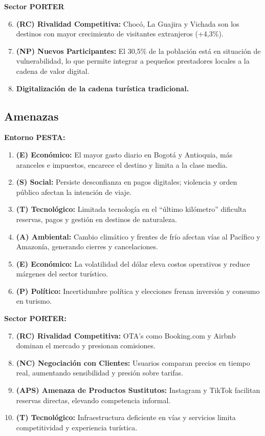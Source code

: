 \documentclass[12pt,a4paper]{article}
\newcommand{\subsectiontitle}[1]{\subsection{#1}}
\begin{document}
\textbf{Sector PORTER}

\begin{enumerate}
    \setcounter{enumi}{5}
    \item \textbf{(RC) Rivalidad Competitiva:} Chocó, La Guajira y Vichada son los destinos con mayor crecimiento de visitantes extranjeros (+4,3\%).
    \item \textbf{(NP) Nuevos Participantes:} El 30,5\% de la población está en situación de vulnerabilidad, lo que permite integrar a pequeños prestadores locales a la cadena de valor digital.
    \item \textbf{Digitalización de la cadena turística tradicional.}
\end{enumerate}

\subsectiontitle{Amenazas}

\textbf{Entorno PESTA:}

\begin{enumerate}
    \item \textbf{(E) Económico:} El mayor gasto diario en Bogotá y Antioquia, más aranceles e impuestos, encarece el destino y limita a la clase media.
    \item \textbf{(S) Social:} Persiste desconfianza en pagos digitales; violencia y orden público afectan la intención de viaje.
    \item \textbf{(T) Tecnológico:} Limitada tecnología en el ``último kilómetro'' dificulta reservas, pagos y gestión en destinos de naturaleza.
    \item \textbf{(A) Ambiental:} Cambio climático y frentes de frío afectan vías al Pacífico y Amazonía, generando cierres y cancelaciones.
    \item \textbf{(E) Económico:} La volatilidad del dólar eleva costos operativos y reduce márgenes del sector turístico.
    \item \textbf{(P) Político:} Incertidumbre política y elecciones frenan inversión y consumo en turismo.
\end{enumerate}

\textbf{Sector PORTER:}

\begin{enumerate}
    \setcounter{enumi}{6}
    \item \textbf{(RC) Rivalidad Competitiva:} OTA's como Booking.com y Airbnb dominan el mercado y presionan comisiones.
    \item \textbf{(NC) Negociación con Clientes:} Usuarios comparan precios en tiempo real, aumentando sensibilidad y presión sobre tarifas.
    \item \textbf{(APS) Amenaza de Productos Sustitutos:} Instagram y TikTok facilitan reservas directas, elevando competencia informal.
    \item \textbf{(T) Tecnológico:} Infraestructura deficiente en vías y servicios limita competitividad y experiencia turística.
\end{enumerate}
\end{document}
